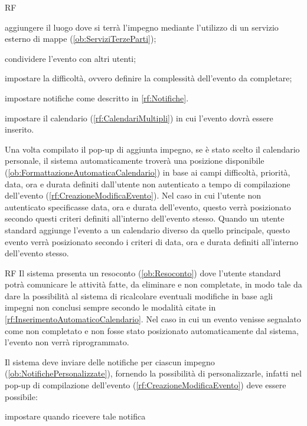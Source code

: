 \begin{listaPersonale}{RF}
\begin{listaPersonale2}[RF]{}
		 aggiungere il luogo dove si terrà l'impegno mediante l'utilizzo di un servizio esterno di mappe (\ref{ob:ServiziTerzeParti});

		 condividere l'evento con altri utenti;

		 impostare la difficoltà, ovvero definire la complessità dell'evento da completare;

		 impostare notifiche come descritto in \ref{rf:Notifiche}.

		 impostare il calendario (\ref{rf:CalendariMultipli}) in cui l'evento dovrà essere inserito.
	\end{listaPersonale2}

	 Una volta compilato il pop-up di aggiunta impegno, se è stato scelto il calendario personale, il sistema automaticamente troverà una posizione disponibile (\ref{ob:FormattazioneAutomaticaCalendario}) in base ai campi difficoltà, priorità, data, ora e durata definiti dall'utente non autenticato a tempo di compilazione dell'evento (\ref{rf:CreazioneModificaEvento}). Nel caso in cui l'utente non autenticato specificasse data, ora e durata dell'evento, questo verrà posizionato secondo questi criteri definiti all'interno dell'evento stesso. Quando un utente standard aggiunge l'evento a un calendario diverso da quello principale, questo evento verrà posizionato secondo i criteri di data, ora e durata definiti all'interno dell'evento stesso.
	\begin{listaPersonale2}{RF}
		 Il sistema presenta un resoconto (\ref{ob:Resoconto}) dove l'utente standard potrà comunicare le attività fatte, da eliminare e non completate, in modo tale da dare la possibilità al sistema di ricalcolare eventuali modifiche in base agli impegni non conclusi sempre secondo le modalità citate in \ref{rf:InserimentoAutomaticoCalendario}. Nel caso in cui un evento venisse segnalato come non completato e non fosse stato posizionato automaticamente dal sistema, l'evento non verrà riprogrammato.
	\end{listaPersonale2}

	 Il sistema deve inviare delle notifiche per ciascun impegno (\ref{ob:NotifichePersonalizzate}), fornendo la possibilità di personalizzarle, infatti nel pop-up di compilazione dell'evento (\ref{rf:CreazioneModificaEvento}) deve essere possibile:
	\begin{listaPersonale2}[RF]{}
		 impostare quando ricevere tale notifica


\end{listaPersonale2}
\end{listaPersonale}

